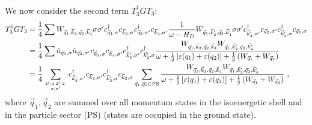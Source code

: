 \documentclass{revtex4-2}
\begin{document}
We now consider the second term \(T_3^\dagger G T_3\):
\begin{equation}\begin{aligned}
	T_3^\dagger G T_3 &= \frac{1}{4}\sum W_{\vec q_1,\vec k_2, \vec q_2, \vec k_4} \sigma\sigma^\prime c^\dagger_{\vec q_1,\sigma}c_{\vec k_2,\sigma}c^\dagger_{\vec q_2,\sigma^\prime}c_{\vec k_4,\sigma^\prime} \frac{1}{\omega - H_D} W_{\vec q_1,\vec k_2^\prime, \vec q_2, \vec k_4^\prime} \sigma\sigma^\prime c^\dagger_{\vec k^\prime_4,\sigma^\prime} c_{\vec q_2,\sigma^\prime} c^\dagger_{\vec k^\prime_2,\sigma} c_{\vec q_1,\sigma}\\
			  &= \frac{1}{4}\sum  \hat n_{\vec q_1,\sigma} \hat n_{\vec q_2,\sigma^\prime} c_{\vec k_2,\sigma} c_{\vec k_4,\sigma^\prime} c^\dagger_{\vec k^\prime_4,\sigma^\prime} c^\dagger_{\vec k^\prime_2,\sigma} \frac{W_{\vec q_1,\vec k_2, \vec q_2, \vec k_4} W_{\vec q_1,\vec k_2^\prime, \vec q_2, \vec k_4^\prime}}{\omega + \frac{1}{2}\left[\varepsilon(q_1) + \varepsilon(q_2)\right] + \frac{1}{2}\left(W_{\vec q_1} + W_{\vec q_2}\right)}\\
			  &= \frac{1}{4}\sum_{4^\prime,4,2^\prime,2,\atop{\sigma,\sigma^\prime}} c^\dagger_{\vec k^\prime_4,\sigma^\prime} c_{\vec k_4,\sigma^\prime} c^\dagger_{\vec k^\prime_2,\sigma}c_{\vec k_2,\sigma}  \sum_{\vec q_1, \vec q_2 \in \text{PS}}\frac{W_{\vec q_1,\vec k_2, \vec q_2, \vec k_4} W_{\vec q_1,\vec k_2^\prime, \vec q_2, \vec k_4^\prime}}{\omega + \frac{1}{2}\left[\varepsilon(q_1) + \varepsilon(q_2)\right] + \frac{1}{2}\left(W_{\vec q_1} + W_{\vec q_2}\right)}~,
\end{aligned}\end{equation}
where \(\vec q_1, \vec q_2\) are summed over all momentum states in the isoenergetic shell and in the particle sector (PS) (states are occupied in the ground state).
\end{document}
